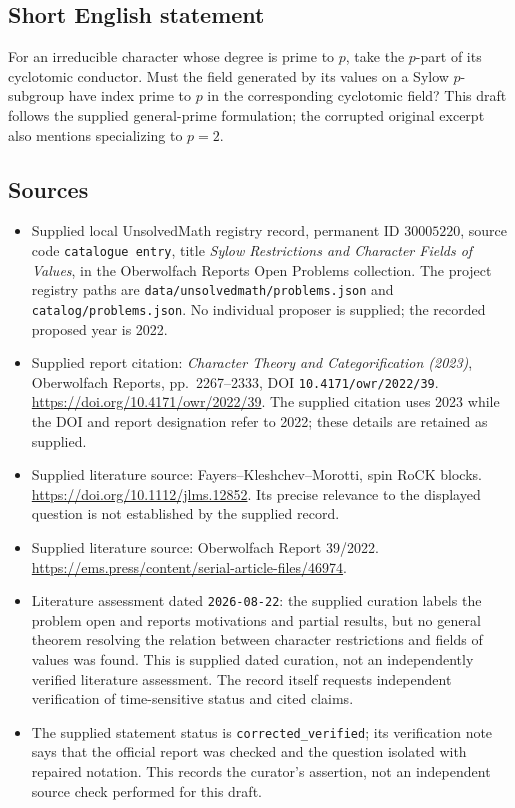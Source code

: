 \documentclass[11pt]{article}
\begin{document}
\subsection{Short English statement}
For an irreducible character whose degree is prime to \(p\), take the \(p\)-part of its cyclotomic conductor. Must the field generated by its values on a Sylow \(p\)-subgroup have index prime to \(p\) in the corresponding cyclotomic field? This draft follows the supplied general-prime formulation; the corrupted original excerpt also mentions specializing to \(p=2\).
\subsection{Sources}
\begin{itemize}
\item Supplied local UnsolvedMath registry record, permanent ID \(30005220\), source code \texttt{catalogue entry}, title \emph{Sylow Restrictions and Character Fields of Values}, in the Oberwolfach Reports Open Problems collection. The project registry paths are \texttt{data/unsolvedmath/problems.json} and \texttt{catalog/problems.json}. No individual proposer is supplied; the recorded proposed year is 2022.
\item Supplied report citation: \emph{Character Theory and Categorification (2023)}, Oberwolfach Reports, pp.\ 2267--2333, DOI \texttt{10.4171/owr/2022/39}. \url{https://doi.org/10.4171/owr/2022/39}. The supplied citation uses 2023 while the DOI and report designation refer to 2022; these details are retained as supplied.
\item Supplied literature source: Fayers--Kleshchev--Morotti, spin RoCK blocks. \url{https://doi.org/10.1112/jlms.12852}. Its precise relevance to the displayed question is not established by the supplied record.
\item Supplied literature source: Oberwolfach Report 39/2022. \url{https://ems.press/content/serial-article-files/46974}.
\item Literature assessment dated \texttt{2026-08-22}: the supplied curation labels the problem open and reports motivations and partial results, but no general theorem resolving the relation between character restrictions and fields of values was found. This is supplied dated curation, not an independently verified literature assessment. The record itself requests independent verification of time-sensitive status and cited claims.
\item The supplied statement status is \texttt{corrected\_verified}; its verification note says that the official report was checked and the question isolated with repaired notation. This records the curator's assertion, not an independent source check performed for this draft.
\end{itemize}
\end{document}
